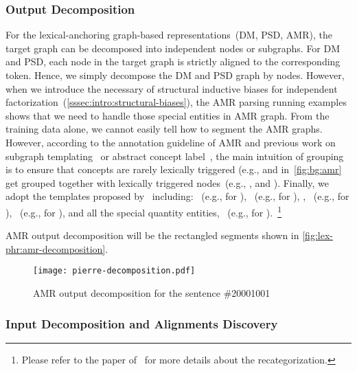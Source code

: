 \subsubsection{Output Decomposition}
\label{sssec:lex-phr:lex-output-decomposition}
For the lexical-anchoring graph-based representations~(DM, PSD, AMR),
the target graph can be decomposed into independent nodes or
subgraphs. For DM and PSD, each node in the target graph is strictly
aligned to the corresponding token. Hence, we simply decompose the DM
and PSD graph by nodes. However, when we introduce the necessary of
structural inductive biases for independent
factorization~(\autoref{sssec:intro:structural-biases}), the AMR
parsing running examples shows that we need to handle those special
entities in AMR graph.  From the training data alone, we cannot easily
tell how to segment the AMR graphs. However, according to the
annotation guideline of AMR and previous work on subgraph
templating~\cite{Werling:2015up} or abstract concept
label~\cite{Wang:2017vt}, the main intuition of grouping is to ensure
that concepts are rarely lexically triggered (e.g., 
and  in~\autoref{fig:bg:amr} get grouped
together with lexically triggered nodes~(e.g., , and ). Finally, we adopt the templates
proposed by~\citet{corro2019learning} including:
~(e.g.,  for
), ~(e.g.,  for ), ,
~(e.g.,  for ),
~(e.g., for
), and all the special quantity entities,
~(e.g.,  for ).~\footnote{Please refer to the
  paper of~\citet{lyu2018amr} for more details about the recategorization.}

AMR output decomposition will be the rectangled segments shown in
\autoref{fig:lex-phr:amr-decomposition}.
\begin{figure}[!tbp]
  \centering
  \texttt{[image: pierre-decomposition.pdf]}
  \caption{\label{fig:lex-phr:amr-decomposition} AMR output
    decomposition for the sentence \#20001001}
\end{figure}

\subsubsection{Input Decomposition and Alignments Discovery}
\label{sssec:lex-phr:lex-input-decomposition}

